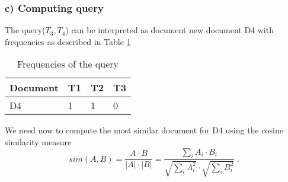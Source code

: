 \documentclass[11pt]{article}
\begin{document}
\subsubsection*{c) Computing query}
The query($T_3, T_4$) can be interpreted as document new document D4 with frequencies
as described in Table \ref{D4}
\begin{table}[h]
\center
\begin{tabular}{l|lll}
	Document & T1 & T2 & T3\\ \hline
	D4 & 1 & 1 & 0\\
\end{tabular}
\caption{Frequencies of the query}
\label{D4}
\end{table}
We need now to compute the most similar document for D4 using the cosine similarity measure
\begin{equation}
	sim(A,B) = \frac{A \cdot B}{|A| \cdot |B|} = \frac{\sum_i A_i \cdot B_i}{\sqrt{\sum_i A_i^2} \cdot \sqrt{\sum_i B_i^2}} \; . 
\end{equation}
\end{document}

